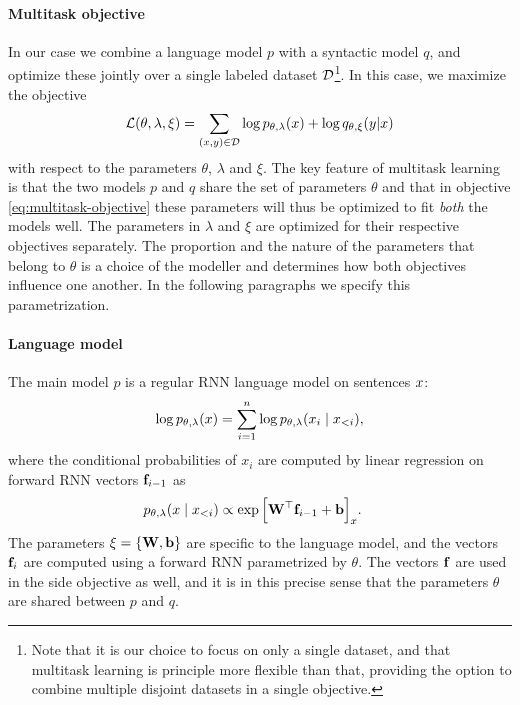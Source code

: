 \paragraph{Multitask objective}
In our case we combine a language model $p$ with a syntactic model $q$, and optimize these jointly over a single labeled dataset $\mathcal{D}$\footnote{Note that it is our choice to focus on only a single dataset, and that multitask learning is principle more flexible than that, providing the option to combine multiple disjoint datasets in a single objective.}. In this case, we maximize the objective
\begin{equation}
  \label{eq:multitask-objective}
  \mathcal{L}(\theta, \lambda, \xi) = \sum_{ (x, y) \in \mathcal{D} }\log p_{\theta, \lambda}(x) + \log q_{\theta,\xi}(y | x)
\end{equation}
with respect to the parameters $\theta$, $\lambda$ and $\xi$. The key feature of multitask learning is that the two models $p$ and $q$ share the set of parameters $\theta$ and that in objective \ref{eq:multitask-objective} these parameters will thus be optimized to fit \textit{both} the models well. The parameters in $\lambda$ and $\xi$ are optimized for their respective objectives separately. The proportion and the nature of the parameters that belong to $\theta$ is a choice of the modeller and determines how both objectives influence one another. In the following paragraphs we specify this parametrization.

\paragraph{Language model}
The main model $p$ is a regular RNN language model on sentences $x$:
\begin{align*}
  \log p_{\theta, \lambda}(x) = \sum_{i=1}^n \log p_{\theta, \lambda}(x_i \mid x_{<i}),
\end{align*}
where the conditional probabilities of $x_i$ are computed by linear regression on forward RNN vectors $\mathbf{f}_{i-1}$ as
\begin{align*}
  p_{\theta, \lambda}( x \mid x_{<i}) &\propto \exp \Big[ \mathbf{W}^{\top} \mathbf{f}_{i-1} + \mathbf{b} \Big]_{x}.
\end{align*}
The parameters $\xi = \{ \mathbf{W}, \mathbf{b} \}$ are specific to the language model, and the vectors $\mathbf{f}_i$ are computed using a forward RNN parametrized by $\theta$. The vectors $\mathbf{f}$ are used in the side objective as well, and it is in this precise sense that the parameters $\theta$ are shared between $p$ and $q$.

